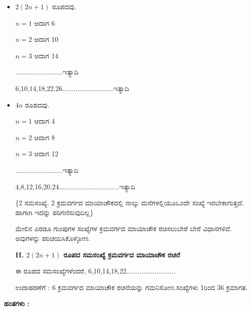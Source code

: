 \begin{itemize}
	\item $2 (2n+1)$ ರೂಪದವು.

	$n=1$ ಆದಾಗ 6

	$n=2$ ಆದಾಗ 10

	$n=3$ ಆದಾಗ 14

	.........................ಇತ್ಯಾದಿ

	6,10,14,18,22,26...........................ಇತ್ಯಾದಿ
	\item $4n$ ರೂಪದವು. 

	$n=1$ ಆದಾಗ 4

	$n=2$ ಆದಾಗ 8

	$n=3$ ಆದಾಗ 12

	.........................ಇತ್ಯಾದಿ

	4,8,12,16,20,24................................ಇತ್ಯಾದಿ

	\{2 ಸಮಸಂಖ್ಯೆ. 2 ಕ್ರಮವರ್ಗದ ಮಾಯಾಚೌಕದಲ್ಲಿ ನಾಲ್ಕು ಮನೆಗಳಲ್ಲಿಯೂ\break ಒಂದೇ ಸಂಖ್ಯೆ ಇರಬೇಕಾಗುತ್ತದೆ. ಹಾಗಾಗಿ ಇದನ್ನು ಪರಿಗಣಿಸುವುದಿಲ್ಲ\}

	ಮೇಲಿನ ಎರಡೂ ಗುಂಪುಗಳ ಸಂಖ್ಯೆಗಳ ಕ್ರಮವರ್ಗದ ಮಾಯಾಚೌಕ ರಚಿಸಲು\break ಬೇರೆ ಬೇರೆ ವಿಧಾನಗಳಿವೆ. ಅವುಗಳನ್ನು ಪರಿಚಯಿಸಿಕೊಳ್ಳೋಣ.

\smallskip
	\textbf{II. $2 (2n+1)$ ರೂಪದ ಸಮಸಂಖ್ಯೆ  ಕ್ರಮವರ್ಗದ ಮಾಯಾಚೌಕ ರಚನೆ}
\smallskip

	ಈ ರೂಪದ ಸಮಸಂಖ್ಯೆಗಳೆಂದರೆ, 6,10,14,18,22..........................

	ಉದಾಹರಣೆಗೆ : 6 ಕ್ರಮವರ್ಗದ ಮಾಯಾಚೌಕ ರಚನೆಯನ್ನು ಗಮನಿಸೋಣ.\break ಸಂಖ್ಯೆಗಳು 1ರಿಂದ 36 ಕ್ರಮಾಗತ.
\end{itemize}

\textbf{ಹಂತಗಳು :}

